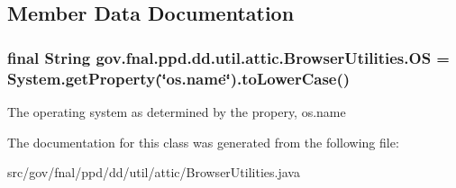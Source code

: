 \subsection{Member Data Documentation}
\hypertarget{classgov_1_1fnal_1_1ppd_1_1dd_1_1util_1_1attic_1_1BrowserUtilities_a622d3aea58a1b1d89af922808fbe6a03}{
\subsubsection[{O\-S}]{\setlength{\rightskip}{0pt plus 5cm}final String gov.\-fnal.\-ppd.\-dd.\-util.\-attic.\-Browser\-Utilities.\-O\-S = System.\-get\-Property(\char`\"{}os.\-name\char`\"{}).to\-Lower\-Case()\hspace{0.3cm}{\ttfamily [static]}}}\label{classgov_1_1fnal_1_1ppd_1_1dd_1_1util_1_1attic_1_1BrowserUtilities_a622d3aea58a1b1d89af922808fbe6a03}
The operating system as determined by the propery, os.\-name 

The documentation for this class was generated from the following file\-:\begin{DoxyCompactItemize}
\item 
src/gov/fnal/ppd/dd/util/attic/Browser\-Utilities.\-java\end{DoxyCompactItemize}
